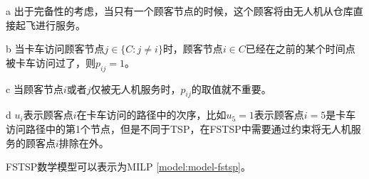 \begin{table}[!htbp]
\begin{threeparttable}
\begin{tabularx}{\textwidth}{lX}
        \bottomrule[1pt] %
    \end{tabularx}
    \begin{tablenotes}
        \footnotesize %
        \item[a] \hypertarget{tab:fstsp-item-1}{}出于完备性的考虑，当只有一个顾客节点的时候，这个顾客将由无人机从仓库直接起飞进行服务。
        \item[b] \hypertarget{tab:fstsp-item-2}{}当卡车访问顾客节点$j\in \{C:j\neq i\}$时，顾客节点$i \in C$已经在之前的某个时间点被卡车访问过了，则$p_{ij} = 1$。
        \item[c] \hypertarget{tab:fstsp-item-3}{}当顾客节点$i$或者$j$仅被无人机服务时，$p_{ij}$的取值就不重要。
        \item[d] \hypertarget{tab:fstsp-item-4}{}$u_i$表示顾客点$i$在卡车访问的路径中的次序，比如$u_5 = 1$表示顾客点$i = 5$是卡车访问路径中的第1个节点，但是不同于TSP，在FSTSP中需要通过约束将无人机服务的顾客点$i$排除在外。
    \end{tablenotes}
    \end{threeparttable}
\end{table}

FSTSP数学模型可以表示为MILP \ref{model:model-fstsp}。

